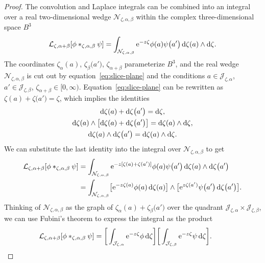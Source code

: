 \documentclass[10pt,a4paper]{amsart}
\newcommand{\laplace}{\mathcal{L}}
\numberwithin{equation}{section}
\begin{document}
\begin{proof}
The convolution and Laplace integrals can be combined into an integral over a real two-dimensional wedge $\mathcal{N}_{\zeta, \alpha, \beta}$ within the complex three-dimensional space $B^3$
\[ \laplace_{\zeta,\alpha+\beta}[{\phi}\ast_{\zeta, \alpha,\beta}{\psi}] = \int_{\mathcal{N}_{\zeta, \alpha, \beta}} {\rm e}^{-z\zeta} \phi(a) \psi\bigl(a'\bigr) \,{\rm d}\zeta(a) \wedge {\rm d}\zeta. \]
The coordinates $\zeta_\alpha(a)$, $\zeta_\beta\bigl(a'\bigr)$, $\zeta_{\alpha+\beta}$ parameterize $B^3$, and the real wedge $\mathcal{N}_{\zeta, \alpha, \beta}$ is cut out by equation~\eqref{eq:slice-plane} and the conditions
$
a \in \mathcal{J}_{\zeta, \alpha}$,
$a' \in \mathcal{J}_{\zeta, \beta}$,
$\zeta_{\alpha+\beta} \in [0, \infty)$.
Equation~\eqref{eq:slice-plane} can be rewritten as $\zeta(a) + \zeta\bigl(a'\bigr) = \zeta$, which implies the identities
\begin{gather*}
{\rm d}\zeta(a) + {\rm d}\zeta\bigl(a'\bigr) = {\rm d}\zeta ,\\
{\rm d}\zeta(a) \wedge \bigl[{\rm d}\zeta(a) + {\rm d}\zeta\bigl(a'\bigr)\bigr] = {\rm d}\zeta(a) \wedge {\rm d}\zeta, \\
{\rm d}\zeta(a) \wedge {\rm d}\zeta\bigl(a'\bigr) = {\rm d}\zeta(a) \wedge {\rm d}\zeta.
\end{gather*}
We can substitute the last identity into the integral over $\mathcal{N}_{\zeta, \alpha, \beta}$ to get
\begin{align*}
\laplace_{\zeta,\alpha+\beta}[{\phi}\ast_{\zeta, \alpha,\beta}{\psi}] & = \int_{\mathcal{N}_{\zeta, \alpha, \beta}} {\rm e}^{-z[\zeta(a) + \zeta(a')]} \phi(a) \psi\bigl(a'\bigr) \,{\rm d}\zeta(a) \wedge {\rm d}\zeta\bigl(a'\bigr) \\
& = \int_{\mathcal{N}_{\zeta, \alpha, \beta}} \bigl[ {\rm e}^{-z\zeta(a)} \phi(a)\, {\rm d}\zeta(a) \bigr] \wedge \bigl[ {\rm e}^{z\zeta(a')} \psi\bigl(a'\bigr) \,{\rm d}\zeta\bigl(a'\bigr) \bigr].
\end{align*}
Thinking of $\mathcal{N}_{\zeta, \alpha, \beta}$ as the graph of $\zeta_\alpha(a) + \zeta_\beta\bigl(a'\bigr)$ over the quadrant $\mathcal{J}_{\zeta, \alpha} \times \mathcal{J}_{\zeta, \beta}$, we can use Fubini's theorem to express the integral as the product
\[ \laplace_{\zeta,\alpha+\beta}[{\phi}\ast_{\zeta, \alpha,\beta}{\psi}] = \bigg[ \int_{\mathcal{J}_{\zeta, \alpha}} {\rm e}^{-z\zeta} \phi\, {\rm d}\zeta \bigg] \bigg[ \int_{\mathcal{J}_{\zeta,\beta}} {\rm e}^{-z\zeta} \psi\, {\rm d}\zeta \bigg]. \tag*{\qed}
\]\renewcommand{\qed}{}
\end{proof}
\end{document}
